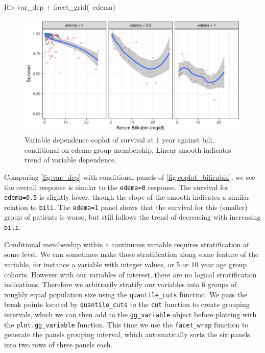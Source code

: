 \documentclass[article]{jss}
\begin{document}
\begin{Schunk}
\begin{Sinput}
R> var_dep + facet_grid(~edema)
\end{Sinput}
\begin{figure}[!htb]

{\centering \includegraphics{rfs-coplot_bilirubin-1} 

}

\caption[Variable dependence coplot of survival at 1 year against bili, conditional on edema group membership]{Variable dependence coplot of survival at 1 year against bili, conditional on edema group membership. Linear smooth indicates trend of variable dependence.}\label{fig:coplot_bilirubin}
\end{figure}
\end{Schunk}

Comparing \autoref{fig:var_dep} with conditional panels of
\autoref{fig:coplot_bilirubin}, we see the overall response is similar
to the \texttt{edema=0} response. The survival for \texttt{edema=0.5} is
slightly lower, though the slope of the smooth indicates a similar
relation to \texttt{bili}. The \texttt{edema=1} panel shows that the
survival for this (smaller) group of patients is worse, but still
follows the trend of decreasing with increasing \texttt{bili}.

Conditional membership within a continuous variable requires
stratification at some level. We can sometimes make these stratification
along some feature of the variable, for instance a variable with integer
values, or 5 or 10 year age group cohorts. However with our variables of
interest, there are no logical stratification indications. Therefore we
arbitrarily stratify our variables into 6 groups of roughly equal
population size using the \texttt{quantile\_cuts} function. We pass the
break points located by \texttt{quantile\_cuts} to the \texttt{cut}
function to create grouping intervals, which we can then add to the
\texttt{gg\_variable} object before plotting with the
\texttt{plot.gg\_variable} function. This time we use the
\texttt{facet\_wrap} function to generate the panels grouping interval,
which automatically sorts the six panels into two rows of three panels
each.
\end{document}
